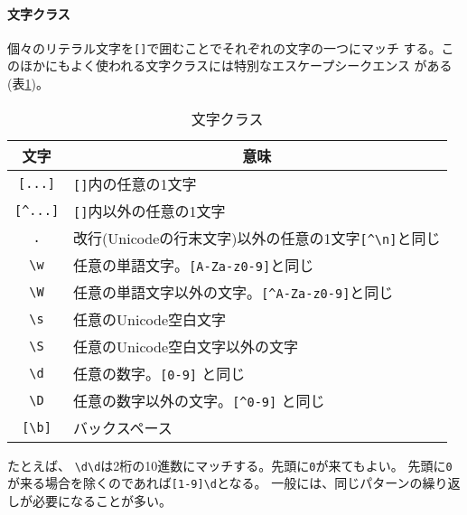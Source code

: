 \paragraph{文字クラス}
個々のリテラル文字を\texttt{[]}で囲むことでそれぞれの文字の一つにマッチ
する。このほかにもよく使われる文字クラスには特別なエスケープシークエンス
がある(表\ref{characterclass})。
\begin{table}[ht]
 \caption{文字クラス}\label{characterclass}
\begin{center}
 \begin{tabular}{|c|l|}\hline
  文字&\multicolumn{1}{c|}{意味}\\\hline
  \texttt{[...]}&\texttt{[]}内の任意の1文字\\\hline
  \Verb+[^...]+& \texttt{[]}内以外の任意の1文字\\ \hline
  \Verb+.+& 改行(Unicodeの行末文字)以外の任意の1文字\Verb+[^\n]+と同じ\\ \hline
  \Verb+\w+& 任意の単語文字。\Verb+[A-Za-z0-9]+と同じ\\ \hline
  \Verb+\W+& 任意の単語文字以外の文字。\Verb+[^A-Za-z0-9]+と同じ\\ \hline
  \Verb+\s+& 任意のUnicode空白文字\\ \hline
  \Verb+\S+& 任意のUnicode空白文字以外の文字\\ \hline
  \Verb+\d+& 任意の数字。\Verb+[0-9]+ と同じ\\ \hline
  \Verb+\D+&任意の数字以外の文字。\Verb+[^0-9]+ と同じ\\\hline
  \Verb+[\b]+& バックスペース\\ \hline
 \end{tabular}
\end{center}
\end{table}

たとえば、 \Verb+\d\d+は2桁の10進数にマッチする。先頭に\Verb+0+が来てもよい。
       先頭に\Verb+0+が来る場合を除くのであれば\Verb+[1-9]\d+となる。
一般には、同じパターンの繰り返しが必要になることが多い。
